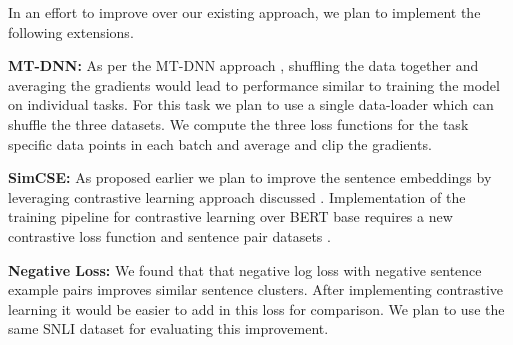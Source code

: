 \documentclass{article}
\begin{document}
In an effort to improve over  our existing approach, we plan to implement the following extensions. 

\textbf{MT-DNN:} As per the MT-DNN approach \cite{mtdnn}, shuffling the data together and averaging the gradients would lead to performance similar to training the model on individual tasks. For this task we plan to use a single data-loader which can shuffle the three datasets. We compute the three loss functions for the task specific data points in each batch and average and clip the gradients.

\textbf{SimCSE:}
As proposed earlier we plan to improve the sentence embeddings by leveraging contrastive learning approach discussed   \cite{simcse}. Implementation of the training pipeline for contrastive learning over BERT base requires a new contrastive loss function and sentence pair datasets \cite{snli:emnlp2015}.

\textbf{Negative Loss:}
We found that that negative log loss with negative sentence example pairs improves similar sentence clusters. After implementing contrastive learning it would be easier to add in this loss for comparison. We plan to use the same SNLI dataset \cite{snli:emnlp2015} for evaluating this improvement.









\end{document}
